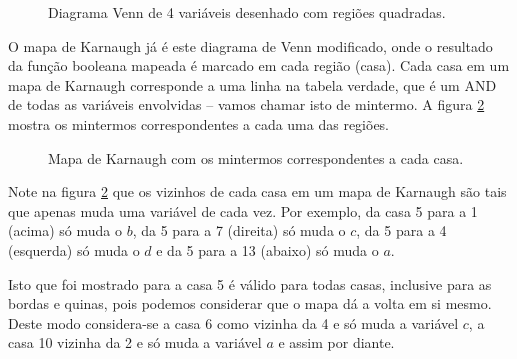 \begin{figure}[!hbt]
\caption{Diagrama Venn de 4 variáveis desenhado com regiões quadradas.}
	\label{fig:Venn4}
\end{figure}

O mapa de Karnaugh já é este diagrama de Venn modificado, onde o resultado da função booleana mapeada é marcado em cada região (casa). Cada casa em um mapa de Karnaugh corresponde a uma linha na tabela verdade, que é um AND de todas as variáveis envolvidas -- vamos chamar isto de mintermo. A figura \ref{fig:karnaugh_mintermos} mostra os mintermos correspondentes a cada uma das regiões.

\begin{figure}[hbt]
	\centering
	\caption{Mapa de Karnaugh com os mintermos correspondentes a cada casa.}
	\label{fig:karnaugh_mintermos}
\end{figure}

Note na figura \ref{fig:karnaugh_mintermos} que os vizinhos de cada casa em um mapa de Karnaugh são tais que apenas muda uma variável de cada vez. Por exemplo, da casa 5 para a 1 (acima) só muda o $b$, da 5 para a 7 (direita) só muda o $c$, da 5 para a 4 (esquerda) só muda o $d$ e da 5 para a 13 (abaixo) só muda o $a$. 

Isto que foi mostrado para a casa 5 é válido para todas casas, inclusive para as bordas e quinas, pois podemos considerar que o mapa dá a volta em si mesmo. Deste modo considera-se a casa 6 como vizinha da 4 e só muda a variável $c$, a casa 10 vizinha da 2 e só muda a variável $a$ e assim por diante.

